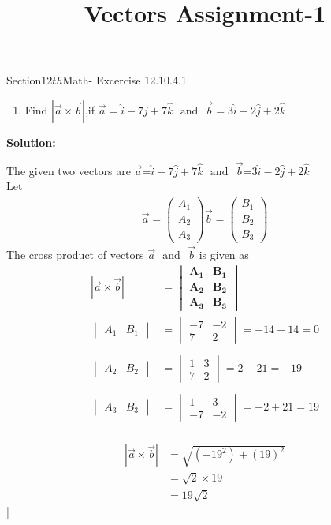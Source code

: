 \documentclass[12pt]{article}
\newcommand{\mydet}[1]{\ensuremath{\begin{vmatrix}#1\end{vmatrix}}}
\providecommand{\abs}[1]{\left\vert#1\right\vert}
\newcommand{\solution}{\noindent \textbf{Solution: }}
\newcommand{\myvec}[1]{\ensuremath{\begin{pmatrix}#1\end{pmatrix}}}
\let\vec\mathbf
\begin{document}
\begin{center}\title{\textbf{Vectors Assignment-1}}
\date{\vspace{-5ex}}
\maketitle
\end{center}
Section{12${th}$Math- Excercise 12.10.4.1}

\begin{enumerate}
\item Find $\abs{\overrightarrow{a}\times\overrightarrow{b}}$,if $\overrightarrow{a}=\hat{i}-7\hat{j}+7\hat{k}$ $\text{ and } $ $\overrightarrow{b}=3\hat{i}-2\hat{j}+2\hat{k}$
\end{enumerate}

\solution

The given two vectors are $\overrightarrow{a}$=$\hat{i}-7\hat{j}+7\hat{k}$  $\text{ and }$  $\overrightarrow{b}$=3$\hat{i}-2\hat{j}+2\hat{k}$ \\
 Let 
	\begin{align}
		\overrightarrow{a}=\myvec{A_1\\A_2\\A_3}
		\overrightarrow{b}=\myvec{B_1\\B_2\\B_3}
	\end{align}
The cross product of vectors $\overrightarrow{a}$ $\text{ and }$ $\overrightarrow{b}$ is given as
\begin{align}
	\abs{\overrightarrow{a}\times\overrightarrow{b}}&=\mydet{\vec{A_1}& \vec{B_1} \\ \vec{A_2} & \vec{B_2} \\\vec{A_3} & \vec{B_3}}\\
\mydet{A_1&B_1}&=\mydet{-7 & -2 \\ 7 & 2}=-14+14=0\\\\
\mydet{A_2&B_2}&=\mydet{1 & 3 \\ 7 & 2}=2-21=-19\\\\
\mydet{A_3&B_3}&=\mydet{1 & 3 \\ -7 & -2}=-2+21=19\\
\end{align}

\begin{align}
	\abs{\overrightarrow{a}\times\overrightarrow{b}}&=\sqrt{(-19^2)+(19)^2}\\
&=\sqrt{2}\times19\\
&=19\sqrt{2}
\end{align}|
\end{document}
